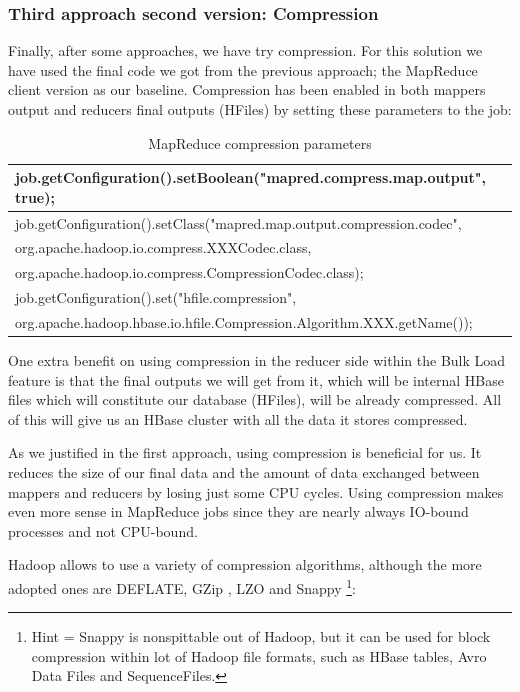 \subsubsection{Third approach second version: Compression}

Finally, after some approaches, we have try compression. For this solution we have used the final code we got from the previous approach; the MapReduce client version as our baseline. Compression has been enabled in both mappers output and reducers final outputs (HFiles) by setting these parameters to the job:

\begin{table}[htbp]

\begin{tabular}{|l|}
\hline
job.getConfiguration().setBoolean("mapred.compress.map.output", true); \\ \hline
job.getConfiguration().setClass("mapred.map.output.compression.codec", \\ \hline
org.apache.hadoop.io.compress.XXXCodec.class, \\ \hline
org.apache.hadoop.io.compress.CompressionCodec.class); \\ \hline
job.getConfiguration().set("hfile.compression", \\ \hline
org.apache.hadoop.hbase.io.hfile.Compression.Algorithm.XXX.getName()); \\ \hline
\end{tabular}
\label{}
\caption{MapReduce compression parameters}
\end{table}

One extra benefit on using compression in the reducer side within the Bulk Load feature is that the final outputs we will get from it, which will be internal HBase files which will constitute our database (HFiles), will be already compressed. All of this will give us an HBase cluster with all the data it stores compressed.
\par
As we justified in the first approach, using compression is beneficial for us. It reduces the size of our final data and the amount of data  exchanged between mappers and reducers by losing just some CPU cycles. Using compression makes even more sense in MapReduce jobs since they are nearly always IO-bound processes and not CPU-bound.
\bigskip
\par
Hadoop allows to use a variety of compression algorithms, although the more adopted ones are DEFLATE, GZip \cite{GZip}, LZO \cite{oberhumer2005lzo} and Snappy \cite{Snappy} \footnote{Hint = Snappy is nonspittable out of Hadoop, but it can be used for block compression within lot of Hadoop file formats, such as HBase tables, Avro Data Files and SequenceFiles.}:

